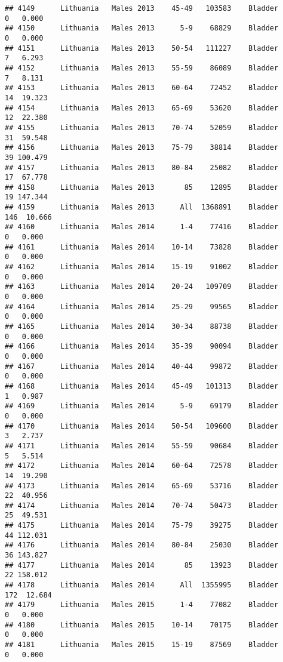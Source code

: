 \documentclass[
]{article}
\begin{document}
\begin{verbatim}
## 4149      Lithuania   Males 2013    45-49   103583    Bladder      0   0.000
## 4150      Lithuania   Males 2013      5-9    68829    Bladder      0   0.000
## 4151      Lithuania   Males 2013    50-54   111227    Bladder      7   6.293
## 4152      Lithuania   Males 2013    55-59    86089    Bladder      7   8.131
## 4153      Lithuania   Males 2013    60-64    72452    Bladder     14  19.323
## 4154      Lithuania   Males 2013    65-69    53620    Bladder     12  22.380
## 4155      Lithuania   Males 2013    70-74    52059    Bladder     31  59.548
## 4156      Lithuania   Males 2013    75-79    38814    Bladder     39 100.479
## 4157      Lithuania   Males 2013    80-84    25082    Bladder     17  67.778
## 4158      Lithuania   Males 2013       85    12895    Bladder     19 147.344
## 4159      Lithuania   Males 2013      All  1368891    Bladder    146  10.666
## 4160      Lithuania   Males 2014      1-4    77416    Bladder      0   0.000
## 4161      Lithuania   Males 2014    10-14    73828    Bladder      0   0.000
## 4162      Lithuania   Males 2014    15-19    91002    Bladder      0   0.000
## 4163      Lithuania   Males 2014    20-24   109709    Bladder      0   0.000
## 4164      Lithuania   Males 2014    25-29    99565    Bladder      0   0.000
## 4165      Lithuania   Males 2014    30-34    88738    Bladder      0   0.000
## 4166      Lithuania   Males 2014    35-39    90094    Bladder      0   0.000
## 4167      Lithuania   Males 2014    40-44    99872    Bladder      0   0.000
## 4168      Lithuania   Males 2014    45-49   101313    Bladder      1   0.987
## 4169      Lithuania   Males 2014      5-9    69179    Bladder      0   0.000
## 4170      Lithuania   Males 2014    50-54   109600    Bladder      3   2.737
## 4171      Lithuania   Males 2014    55-59    90684    Bladder      5   5.514
## 4172      Lithuania   Males 2014    60-64    72578    Bladder     14  19.290
## 4173      Lithuania   Males 2014    65-69    53716    Bladder     22  40.956
## 4174      Lithuania   Males 2014    70-74    50473    Bladder     25  49.531
## 4175      Lithuania   Males 2014    75-79    39275    Bladder     44 112.031
## 4176      Lithuania   Males 2014    80-84    25030    Bladder     36 143.827
## 4177      Lithuania   Males 2014       85    13923    Bladder     22 158.012
## 4178      Lithuania   Males 2014      All  1355995    Bladder    172  12.684
## 4179      Lithuania   Males 2015      1-4    77082    Bladder      0   0.000
## 4180      Lithuania   Males 2015    10-14    70175    Bladder      0   0.000
## 4181      Lithuania   Males 2015    15-19    87569    Bladder      0   0.000

\end{verbatim}
\end{document}

